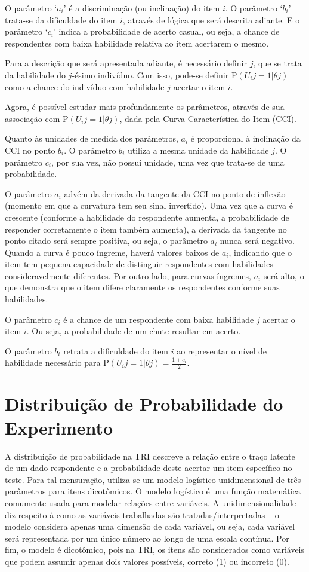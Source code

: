 \documentclass{article}
\begin{document}
O parâmetro ‘$a_i$’ é a discriminação (ou inclinação) do item $i$. O parâmetro ‘$b_i$’ trata-se da dificuldade do item $i$, através de lógica que será descrita adiante. E o parâmetro ‘$c_i$’ indica a probabilidade de acerto casual, ou seja, a chance de respondentes com baixa habilidade relativa ao item acertarem o mesmo.

Para a descrição que será apresentada adiante, é necessário definir $j$, que se trata  da habilidade do $j$-ésimo indivíduo. Com isso, pode-se definir $\text{P}(U_ij = 1|\theta j )$ como a chance do indivíduo com habilidade $j$ acertar o item $i$.

Agora, é possível estudar mais profundamente os parâmetros, através de sua associação com $\text{P}(U_ij = 1|\theta j)$, dada pela Curva Característica do Item (CCI). 

Quanto às unidades de medida dos parâmetros, $a_i$ é proporcional à inclinação da CCI no ponto $b_i$. O parâmetro $b_i$ utiliza a mesma unidade da habilidade $j$. O parâmetro $c_i$, por sua vez, não possui unidade, uma vez que trata-se de uma probabilidade.

O parâmetro $a_i$ advém da derivada da tangente da CCI no ponto de inflexão (momento em que a curvatura tem seu sinal invertido). Uma vez que a curva é crescente (conforme a habilidade do respondente aumenta, a probabilidade de responder corretamente o item também aumenta), a derivada da tangente no ponto citado será sempre positiva, ou seja, o parâmetro $a_i$ nunca será negativo. Quando a curva é pouco íngreme, haverá valores baixos de $a_i$, indicando que o item tem pequena capacidade de distinguir respondentes com habilidades consideravelmente diferentes. Por outro lado, para curvas íngremes, $a_i$ será alto, o que demonstra que o item difere claramente os respondentes conforme suas habilidades.

O parâmetro $c_i$ é a chance de um respondente com baixa habilidade $j$ acertar o item $i$. Ou seja, a probabilidade de um chute resultar em acerto.

O parâmetro $b_i$ retrata a dificuldade do item $i$ ao representar o nível de habilidade necessário para $\text{P}(U_ij = 1|\theta j ) = \frac{1 + c_i}{2}$. 

\section{Distribuição de Probabilidade do Experimento}

A distribuição de probabilidade na TRI descreve a relação entre o traço latente de um dado respondente e a probabilidade deste acertar um item específico no teste. Para tal mensuração, utiliza-se um modelo logístico unidimensional de três parâmetros para itens dicotômicos.
O modelo logístico é uma função matemática comumente usada para modelar relações entre variáveis. A unidimensionalidade diz respeito à como as variáveis trabalhadas são tratadas/interpretadas – o modelo considera apenas uma dimensão de cada variável, ou seja, cada variável será representada por um único número ao longo de uma escala contínua. Por fim, o modelo é dicotômico, pois na TRI, os itens são considerados como variáveis que podem assumir apenas dois valores possíveis, correto (1) ou incorreto (0).
\end{document}
